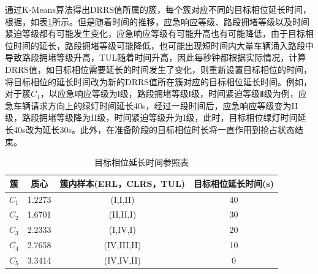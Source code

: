 通过K-Means算法得出DRRS值所属的簇，每个簇对应不同的目标相位延长时间，根据，如表\ref{table:extendtime}所示。但是随着时间的推移，应急响应等级、路段拥堵等级以及时间紧迫等级都有可能发生变化，应急响应等级有可能升高也有可能降低，由于目标相位时间的延长，路段拥堵等级可能降低，也可能出现短时间内大量车辆涌入路段中导致路段拥堵等级升高，TUL随着时间升高，因此每秒钟都根据实际情况，计算DRRS值，如目标相位需要延长的时间发生了变化，则重新设置目标相位的时间，将目标相位的延长时间改为新的DRRS值所在簇对应的目标相位延长时间。例如，对于簇${C_1}$，以应急响应等级为Ⅰ级，路段拥堵等级Ⅰ级，时间紧迫等级Ⅱ级为例，应急车辆请求方向上的绿灯时间延长40s，经过一段时间后，应急响应等级变为II级，路段拥堵等级降为II级，时间紧迫等级升为I级，此时，目标相位绿灯时间延长40s改为延长30s。此外，在准备阶段的目标相位时长将一直作用到抢占状态结束。

\begin{table}[H]
	\centering
	\caption{目标相位延长时间参照表}
	\label{table:extendtime}
	\begin{tabular}{|c|c|c|c|}
		\hline
		簇 & 质心 & 簇内样本(ERL，CLRS，TUL) &  目标相位延长时间(s) \\
		\hline
		${C_1}$ & 1.2273 & (I,I,II) & 40 \\ \hline
		${C_2}$ & 1.6701 & (II,II,I) & 30 \\ \hline
		${C_3}$ & 2.2333 & (I,IV,I) & 20 \\ \hline
		${C_4}$ & 2.7658 & (IV,III,II) & 10 \\ \hline
		${C_5}$ & 3.3414 & (IV,IV,II) & 0 \\ \hline
	\end{tabular}
\end{table}



